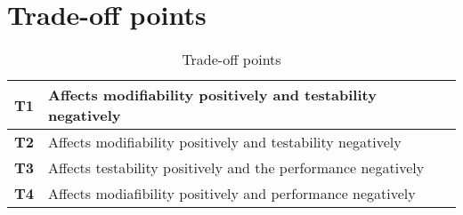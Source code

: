 \section{Trade-off points}

\begin{table}[H]
\small
\begin{tabular}{| p{} | p{} |} \hline
{\bf T1} & Affects modifiability positively and testability negatively \\ \hline
{\bf T2} & Affects modifiability positively and testability negatively\\ \hline
{\bf T3} & Affects testability positively and the performance negatively \\ \hline
{\bf T4} & Affects modiafibility positively and performance negatively \\ \hline
\end{tabular}
\caption{Trade-off points}
\end{table}
